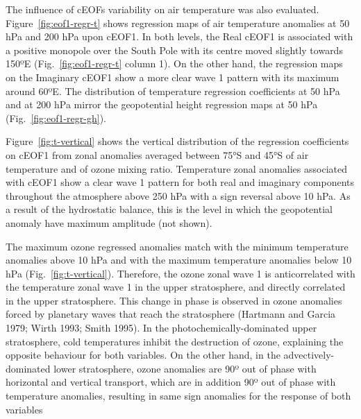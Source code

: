 \documentclass[smallextended]{svjour3}       %
\begin{document}
The influence of cEOFs variability on air temperature was also evaluated.
Figure~\ref{fig:eof1-regr-t} shows regression maps of air temperature anomalies at 50 hPa and 200 hPa upon cEOF1.
In both levels, the Real cEOF1 is associated with a positive monopole over the South Pole with its centre moved slightly towards 150ºE (Fig.~\ref{fig:eof1-regr-t} column 1).
On the other hand, the regression maps on the Imaginary cEOF1 show a more clear wave 1 pattern with its maximum around 60ºE.
The distribution of temperature regression coefficients at 50 hPa and at 200 hPa mirror the geopotential height regression maps at 50 hPa (Fig.~\ref{fig:eof1-regr-gh}).

Figure~\ref{fig:t-vertical} shows the vertical distribution of the regression coefficients on cEOF1 from zonal anomalies averaged between 75°S and 45°S of air temperature and of ozone mixing ratio.
Temperature zonal anomalies associated with cEOF1 show a clear wave 1 pattern for both real and imaginary components throughout the atmosphere above 250 hPa with a sign reversal above 10 hPa.
As a result of the hydrostatic balance, this is the level in which the geopotential anomaly have maximum amplitude (not shown).

The maximum ozone regressed anomalies match with the minimum temperature anomalies above 10 hPa and with the maximum temperature anomalies below 10 hPa (Fig.~\ref{fig:t-vertical}).
Therefore, the ozone zonal wave 1 is anticorrelated with the temperature zonal wave 1 in the upper stratosphere, and directly correlated in the upper stratosphere.
This change in phase is observed in ozone anomalies forced by planetary waves that reach the stratosphere (Hartmann and Garcia 1979; Wirth 1993; Smith 1995).
In the photochemically-dominated upper stratosphere, cold temperatures inhibit the destruction of ozone, explaining the opposite behaviour for both variables.
On the other hand, in the advectively-dominated lower stratosphere, ozone anomalies are 90º out of phase with horizontal and vertical transport, which are in addition 90º out of phase with temperature anomalies, resulting in same sign anomalies for the response of both variables
\end{document}
